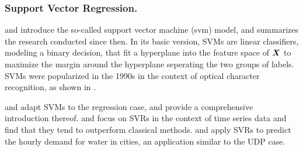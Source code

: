 \subsubsection{Support Vector Regression.}
\label{svm}

\cite{vapnik1963} and \cite{vapnik1964} introduce the so-called support vector
    machine (\gls{svm}) model, and \cite{vapnik2013} summarizes the research
    conducted since then.
In its basic version, SVMs are linear classifiers, modeling a binary
    decision, that fit a hyperplane into the feature space of $\bm{X}$ to
    maximize the margin around the hyperplane seperating the two groups of
    labels.
SVMs were popularized in the 1990s in the context of optical character
    recognition, as shown in \cite{scholkopf1998}.

\cite{drucker1997} and \cite{stitson1999} adapt SVMs to the regression case,
    and \cite{smola2004} provide a comprehensive introduction thereof.
\cite{mueller1997} and \cite{mueller1999} focus on SVRs in the context of time
    series data and find that they tend to outperform classical methods.
\cite{chen2006a} and \cite{chen2006b} apply SVRs to predict the hourly demand
    for water in cities, an application similar to the UDP case.

